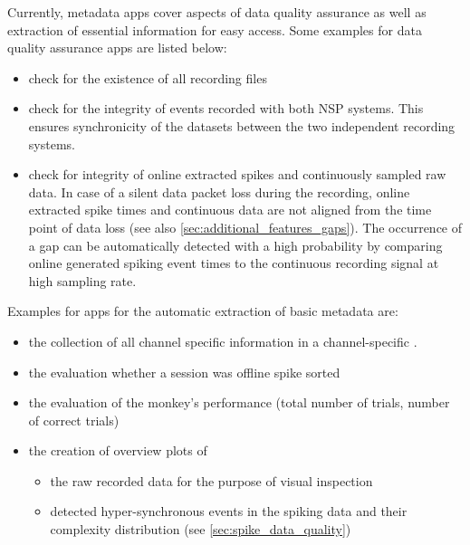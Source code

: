 Currently, metadata apps cover aspects of data quality assurance as well as extraction of essential information for easy access. Some examples for data quality assurance apps are listed below:
\begin{itemize}
 \item check for the existence of all recording files
 \item check for the integrity of events recorded with both NSP systems. This ensures synchronicity of the datasets between the two independent  recording systems.
 \item check for integrity of online extracted spikes and continuously sampled raw data. In case of a silent data packet loss during the recording, online extracted spike times and continuous data are not aligned from the time point of data loss (see also \cref{sec:additional_features_gaps}). The occurrence of a gap can be automatically detected with a high probability by comparing online generated spiking event times to the continuous recording signal at high sampling rate.
\end{itemize}

Examples for apps for the automatic extraction of basic metadata are:
\begin{itemize}
  \setlength{\itemsep}{0pt}
  \setlength{\parskip}{0pt}
  \setlength{\parsep}{0pt}
 \item the collection of all channel specific information in a channel-specific  .
 \item the evaluation whether a session was offline spike sorted
 \item the evaluation of the monkey's performance (total number of trials, number of correct trials)
 \item the creation of overview plots of 
 \begin{itemize}
  \setlength\itemsep{0pt}
  \setlength{\parskip}{0pt}
  \setlength{\parsep}{0pt}
  \item the raw recorded data for the purpose of visual inspection
  \item detected hyper-synchronous events in the spiking data and their complexity distribution (see \cref{sec:spike_data_quality})
 \end{itemize}
\end{itemize}

